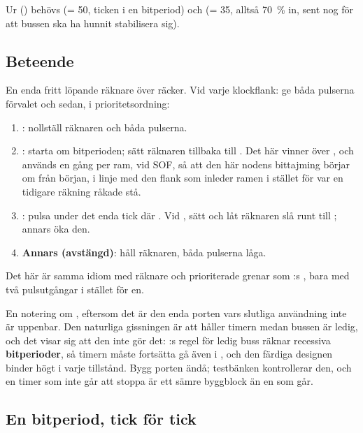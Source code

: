 Ur  () behövs  (= 50, ticken i en bitperiod) och
 (= 35, alltså 70~\% in, sent nog för att bussen ska ha hunnit stabilisera sig).

\subsection{Beteende}
\label{c12:sub:btbehav}

En enda fritt löpande räknare över  räcker. Vid varje klockflank: ge
båda pulserna förvalet  och sedan, i prioritetsordning:
\begin{enumerate}
  \item \textbf{}: nollställ räknaren och båda pulserna.
  \item \textbf{}: starta om bitperioden; sätt räknaren tillbaka till .
    Det här vinner över , och används en gång per ram, vid SOF, så att den här nodens
    bittajming börjar om från början, i linje med den flank som inleder ramen i stället för var en
    tidigare räkning råkade stå.
  \item \textbf{}: pulsa  under det enda tick där
    . Vid , sätt  och
    låt räknaren slå runt till ; annars öka den.
  \item \textbf{Annars (avstängd)}: håll räknaren, båda pulserna låga.
\end{enumerate}

Det här är samma idiom med räknare och prioriterade grenar som :s , bara
med två pulsutgångar i stället för en.

\begin{aside}
En notering om , eftersom det är den enda porten vars slutliga användning inte är
uppenbar. Den naturliga gissningen är att  håller timern medan bussen är ledig,
och det visar sig att den inte gör det: :s regel för ledig buss räknar recessiva
\textbf{bitperioder}, så timern måste fortsätta gå även i , och den färdiga designen
binder  högt i varje tillstånd. Bygg porten ändå; testbänken kontrollerar den, och en
timer som inte går att stoppa är ett sämre byggblock än en som går.
\end{aside}

\subsection{En bitperiod, tick för tick}
\label{c12:sub:bttrace}

